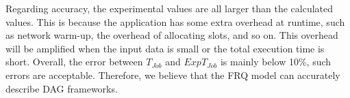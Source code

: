 {Regarding accuracy, the experimental values are all larger than the calculated values. This is because the application has some extra overhead at runtime, such as network warm-up, the overhead of allocating slots, and so on. 
This overhead will be amplified when the input data is small or the total execution time is short. 
Overall, the error between \(T_{Job}\) and \(ExpT_{Job}\) is mainly below 10\%, such errors are acceptable. Therefore, we believe that the FRQ model can accurately describe DAG frameworks.
}